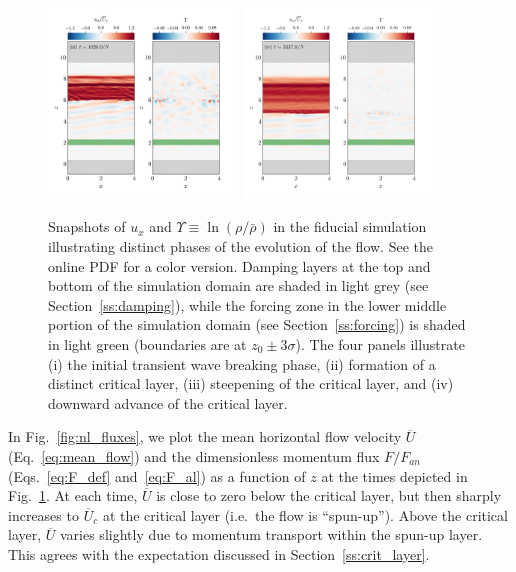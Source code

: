 \documentclass[
        fleqn,
        usenatbib,
    ]{mnras}
\newcommand*{\p}[1]{\left(#1\right)}
\begin{document}
\begin{figure}
    \includegraphics[width=0.45\textwidth]{plots/yubo_000134_labeled.png}\hfil
    \includegraphics[width=0.45\textwidth]{plots/yubo_000451_labeled.png}
    \caption{Snapshots of $u_x$ and $\Upsilon \equiv \ln \p{\rho / \bar{\rho}}$
    in the fiducial simulation illustrating distinct phases of the evolution of
    the flow. \textcolor{Corr}{See the online PDF for a color version.} Damping
    layers \textcolor{Corr}{at the top and bottom of the simulation domain} are
    shaded in light grey (see Section~\ref{ss:damping}), while the forcing zone
    \textcolor{Corr}{in the lower middle portion of the simulation domain} (see
    Section~\ref{ss:forcing}) is shaded in light green (boundaries are at $z_0
    \pm 3\sigma$). The four panels illustrate (i) the initial transient wave
    breaking phase, (ii) formation of a distinct critical layer, (iii)
    steepening of the critical layer, and (iv) downward advance of the critical
    layer.}\label{fig:snapshots}
\end{figure}

In Fig.~\ref{fig:nl_fluxes}, we plot the mean horizontal flow velocity
$\overline{U}$ (Eq.~\eqref{eq:mean_flow}) and the dimensionless momentum flux $F
/ F_{an}$ (Eqs.~\eqref{eq:F_def} and~\eqref{eq:F_al}) as a function of $z$ at
the times depicted in Fig.~\ref{fig:snapshots}. At each time, $\overline{U}$ is
close to zero below the critical layer, but then sharply increases to
$\overline{U}_c$ at the critical layer (i.e.\ the flow is ``spun-up''). Above
the critical layer, $\overline{U}$ varies slightly due to momentum transport
within the spun-up layer. This agrees with the expectation discussed in
Section~\ref{ss:crit_layer}.
\end{document}
